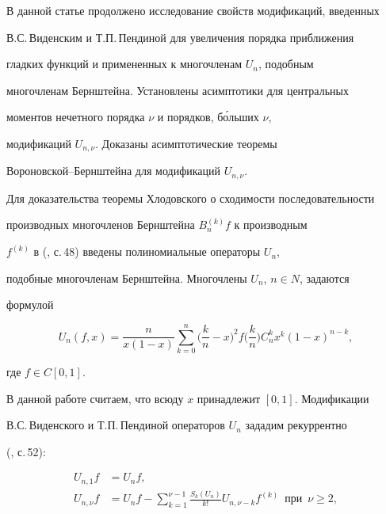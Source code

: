  


В данной статье продолжено исследование свойств модификаций, введенных 


В.С.\,Виденским и Т.П.\,Пендиной для увеличения порядка приближения 


гладких функций и примененных к многочленам $U_n$, подобным 


многочленам Бернштейна. Установлены асимптотики для центральных 


моментов нечетного порядка $\nu$ и порядков, б\'ольших $\nu$, 


модификаций $U_{n,\nu}$. Доказаны асимптотические теоремы 


Вороновской--Бернштейна для модификаций $U_{n,\nu}$. 


 


Для доказательства теоремы Хлодовского о сходимости последовательности 


производных многочленов Бернштейна $B^{(k)}_n f$ к производным 


$f^{(k)}$ в (\cite{1}, с.\,48) введены полиномиальные операторы $U_n$, 


подобные многочленам Бернштейна. Многочлены $U_n$, $n\in N$, задаются 


формулой 


\begin{equation} 


U_n(f,x)=\frac{n}{x(1-x)}\sum^n_{k=0}\bigg(\frac{k}{n}-x\bigg)^2 


f\bigg(\frac{k}{n}\bigg)C^k_n x^k(1-x)^{n-k}, 


\end{equation} 


где $f\in C[0,1]$. 


 


В данной работе считаем, что всюду $x$ принадлежит $[0,1]$. Модификации 


В.С.\,Виденского и Т.П.\,Пендиной операторов $U_n$ зададим рекуррентно 


(\cite{2}, с.\,52): 


\begin{equation} 


\begin{split} 


U_{n,1}f&=U_n f,\\ 


U_{n,\nu}f&=U_n f-\sum^{\nu-1}_{k=1} 


\frac{S_k(U_n)}{k!}U_{n,\nu-k}f^{(k)}\ \; 


\text{при} \ \; \nu\ge2, 


\end{split} 


\end{equation} 


